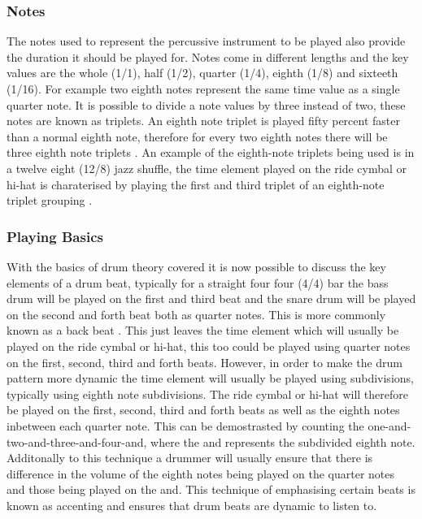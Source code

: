 \documentclass[a4paper, 11pt]{article}
\begin{document}
\maketitle{} \subsubsection{Notes}
The notes used to represent the percussive instrument to be played also provide the duration it should be played for. Notes come in different lengths and the key values are the whole (1/1), half (1/2), quarter (1/4), eighth (1/8) and sixteeth (1/16). For example two eighth notes represent the same time value as a single quarter note. It is possible to divide a note values by three instead of two, these notes are known as triplets. An eighth note triplet is played fifty percent faster than a normal eighth note, therefore for every two eighth notes there will be three eighth note triplets \cite{drum-note}. An example of the eighth-note triplets being used is in a twelve eight (12/8) jazz shuffle, the time element played on the ride cymbal or hi-hat is charaterised by playing the first and third triplet of an eighth-note triplet grouping \cite{drum-bible}.

\maketitle{} \subsubsection{Playing Basics}
With the basics of drum theory covered it is now possible to discuss the key elements of a drum beat, typically for a straight four four (4/4) bar the bass drum will be played on the first and third beat and the snare drum will be played on the second and forth beat both as quarter notes. This is more commonly known as a back beat \cite{drum-bible}. This just leaves the time element which will usually be played on the ride cymbal or hi-hat, this too could be played using quarter notes on the first, second, third and forth beats. However, in order to make the drum pattern more dynamic the time element will usually be played using subdivisions, typically using eighth note subdivisions. The ride cymbal or hi-hat will therefore be played on the first, second, third and forth beats as well as the eighth notes inbetween each quarter note. This can be demostrasted by counting the one-and-two-and-three-and-four-and, where the and represents the subdivided eighth note. Additonally to this technique a drummer will usually ensure that there is difference in the volume of the eighth notes being played on the quarter notes and those being played on the and. This technique of emphasising certain beats is known as accenting and ensures that drum beats are dynamic to listen to.
\end{document}
